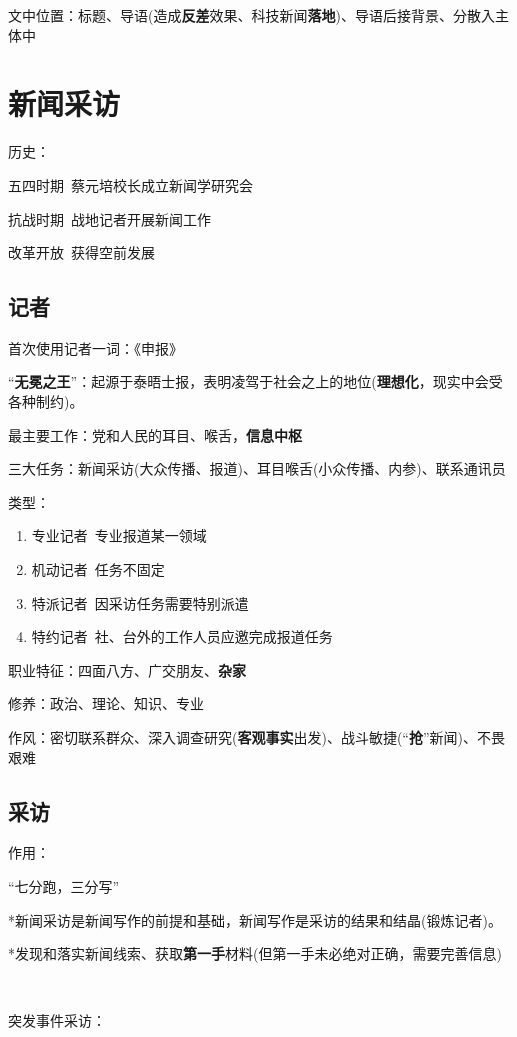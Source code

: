 \documentclass[a4paper,UTF8]{ctexart}
\begin{document}
文中位置：标题、导语(造成\textbf{反差}效果、科技新闻\textbf{落地})、导语后接背景、分散入主体中

\section{新闻采访}
历史：

五四时期\ 蔡元培校长成立新闻学研究会

抗战时期\ 战地记者开展新闻工作

改革开放\ 获得空前发展

\subsection{记者}

首次使用记者一词：《申报》

“\textbf{无冕之王}”：起源于泰晤士报，表明凌驾于社会之上的地位(\textbf{理想化}，现实中会受各种制约)。

最主要工作：党和人民的耳目、喉舌，\textbf{信息中枢}

三大任务：新闻采访(大众传播、报道)、耳目喉舌(小众传播、内参)、联系通讯员

类型：

\begin{enumerate}
	\item 专业记者\ 专业报道某一领域
	\item 机动记者\ 任务不固定
	\item 特派记者\ 因采访任务需要特别派遣
	\item 特约记者\ 社、台外的工作人员应邀完成报道任务
\end{enumerate}

职业特征：四面八方、广交朋友、\textbf{杂家}

修养：政治、理论、知识、专业

作风：密切联系群众、深入调查研究(\textbf{客观事实}出发)、战斗敏捷(“\textbf{抢}”新闻)、不畏艰难

\subsection{采访}
作用：

“七分跑，三分写”

*新闻采访是新闻写作的前提和基础，新闻写作是采访的结果和结晶(锻炼记者)。

*发现和落实新闻线索、获取\textbf{第一手}材料(但第一手未必绝对正确，需要完善信息)

~

突发事件采访：
\end{document}
